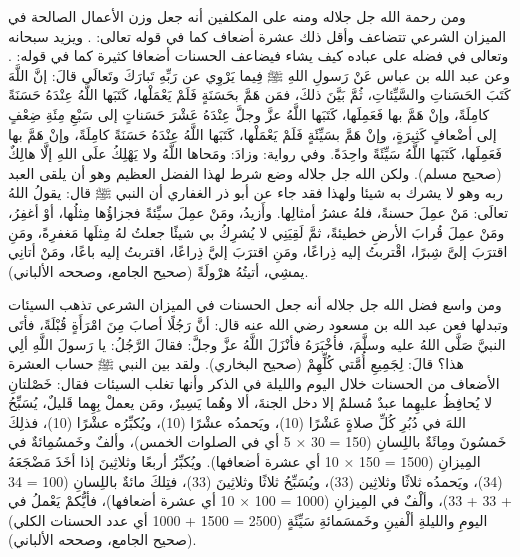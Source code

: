 ومن رحمة الله جل جلاله ومنه على المكلفين أنه جعل وزن الأعمال الصالحة في الميزان الشرعي تتضاعف وأقل ذلك عشرة أضعاف كما في قوله تعالى: 
\quranayah*[6][160]{\footnotesize \surahname*[6]}. ويزيد سبحانه وتعالى في فضله على عباده كيف يشاء فيضاعف الحسنات أضعافا كثيرة كما في قوله: 
\quranayah*[2][245]{\footnotesize \surahname*[2]}.
وعن عبد الله بن عباس عَنْ رَسولِ اللهِ ﷺ فِيما يَرْوِي عن رَبِّهِ تَبارَكَ وتَعالَى قالَ: إنَّ اللَّهَ كَتَبَ الحَسَناتِ والسَّيِّئاتِ، ثُمَّ بَيَّنَ ذلكَ، فمَن هَمَّ بحَسَنَةٍ فَلَمْ يَعْمَلْها، كَتَبَها اللَّهُ عِنْدَهُ حَسَنَةً كامِلَةً، وإنْ هَمَّ بها فَعَمِلَها، كَتَبَها اللَّهُ عزَّ وجلَّ عِنْدَهُ عَشْرَ حَسَناتٍ إلى سَبْعِ مِئَةِ ضِعْفٍ إلى أضْعافٍ كَثِيرَةٍ، وإنْ هَمَّ بسَيِّئَةٍ فَلَمْ يَعْمَلْها، كَتَبَها اللَّهُ عِنْدَهُ حَسَنَةً كامِلَةً، وإنْ هَمَّ بها فَعَمِلَها، كَتَبَها اللَّهُ سَيِّئَةً واحِدَةً. وفي رواية: وزادَ: ومَحاها اللَّهُ ولا يَهْلِكُ علَى اللهِ إلَّا هالِكٌ {\footnotesize (صحيح مسلم)}. ولكن الله جل جلاله وضع شرط لهذا الفضل العظيم وهو أن يلقى العبد ربه وهو لا يشرك به شيئا ولهذا فقد جاء عن أبو ذر الغفاري أن النبي ﷺ قال: يقولُ اللهُ تعالَى: مَنْ عمِلَ حسنةً، فلهُ عشرُ أمثالِها. وأَزيدُ، ومَنْ عمِلَ سيِّئةً فجزاؤُها مِثلُها، أوْ أغفِرُ، ومَنْ عمِلَ قُرابَ الأرضِ خطيئةً، ثمَّ لَقِيَنِي لا يُشرِكُ بي شيئًا جعلتُ لهُ مِثلَها مَغفرِةً، ومَنِ اقترَبَ إلىَّ شِبرًا، اقْتربتُ إليه ذِراعًا، ومَنِ اقترَبَ إليَّ ذِراعًا، اقتربتُ إليه باعًا، ومَنْ أتانِي يمشِي، أتيتُهُ هرْولَةً {\footnotesize (صحيح الجامع، وصححه الألباني)}.

ومن واسع فضل الله جل جلاله أنه جعل الحسنات في الميزان الشرعي تذهب السيئات وتبدلها فعن عبد الله بن مسعود رضي الله عنه قال: أنَّ رَجُلًا أصابَ مِنَ امْرَأَةٍ قُبْلَةً، فأتَى النبيَّ صَلَّى اللهُ عليه وسلَّمَ، فأخْبَرَهُ فأنْزَلَ اللَّهُ عزَّ وجلَّ: \quranayah*[11][114]{\footnotesize \surahname*[11]} فقالَ الرَّجُلُ: يا رَسولَ اللَّهِ ألِي هذا؟ قالَ: لِجَمِيعِ أُمَّتي كُلِّهِمْ {\footnotesize (صحيح البخاري)}. ولقد بين النبي ﷺ حساب العشرة الأضعاف من الحسنات خلال اليوم والليلة في الذكر وأنها تغلب السيئات فقال: خَصْلتانِ لا يُحافِظُ عليهِما عبدٌ مُسلمٌ إلا دخل الجنةَ، ألا وهُما يَسِيرٌ، ومَن يعملْ بِهِما قَليلٌ، يُسَبِّحُ اللهَ في دُبُرِ كُلِّ صلاةٍ عَشْرًا (10)، ويَحمدُه عشْرًا (10)، ويُكبِّرُه عشْرًا (10)، فذلِكَ خَمسُونَ ومِائَةٌ باللِسانِ (150 = 30 × 5 أي في الصلوات الخمس)، وألفٌ وخَمسُمِائةٌ في المِيزانِ (1500 = 150 × 10 أي عشرة أضعافها). ويُكبِّرُ أربعًا وثلاثِينَ إذا أخَذَ مَضْجَعَهُ (34)، ويَحمدُه ثلاثًا وثلاثِين (33)، ويُسَبِّحُ ثلاثًا وثلاثِينَ (33)، فتِلكَ مائةٌ باللِسانِ (100 = 34 + 33 + 33)، وألْفٌ في المِيزانِ (1000 = 100 × 10 أي عشرة أضعافها)، فأيُّكمْ يَعْملُ في اليومِ والليلةِ ألْفينِ وخَمسَمائةِ سَيِّئَةٍ (2500 = 1500 + 1000 أي عدد الحسنات الكلي) {\footnotesize (صحيح الجامع، وصححه الألباني)}.

